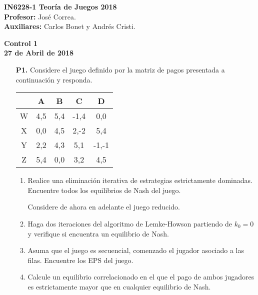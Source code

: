 \documentclass[11pt, spanish]{article}
\theoremstyle{plain}
\begin{document}
\begin{flushleft}
  \textbf{IN6228-1 Teoría de Juegos 2018}
  \\\textbf{Profesor:} José Correa.
  \\\textbf{Auxiliares:} Carlos Bonet y Andrés Cristi.
\end{flushleft}


\begin{center}
  \large{\textbf{Control 1\\ 27 de Abril de 2018}}
\end{center}




\begin{itemize}
  \item[\textbf{P1.}] Considere el juego definido por la matriz de pagos presentada a continuaci\'on y responda. 
  \begin{center}
  \begin{tabular}{c|c|c|c|c}
                   &A & B & C & D\\
      \hline
       W& 4,5 & 5,4 & -1,4& 0,0\\
       X& 0,0 & 4,5 & 2,-2& 5,4\\
       Y& 2,2 & 4,3 & 5,1& -1,-1\\
       Z& 5,4 & 0,0 & 3,2& 4,5\\

  \end{tabular}
  \end{center}

  \begin{enumerate}
    \item Realice una eliminaci\'on iterativa de estrategias estrictamente dominadas. Encuentre todos los equilibrios de Nash del juego.

    Considere de ahora en adelante el juego reducido.
    \item Haga dos iteraciones del algoritmo de Lemke-Howson partiendo de $k_0 = 0$ y verifique si encuentra un equilibrio de Nash.
    \item Asuma que el juego es secuencial, comenzado el jugador asociado a las filas. Encuentre los EPS del juego.
    \item Calcule un equilibrio correlacionado en el que el pago de ambos jugadores es estrictamente mayor que en cualquier equilibrio de Nash.
  \end{enumerate}


\end{itemize}
\end{document}
